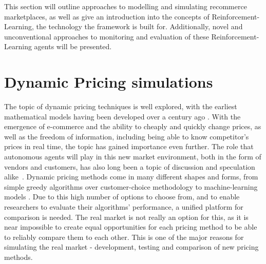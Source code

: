 \begin{jointwork}\label{ch:RelatedWork}
	This section will outline approaches to modelling and simulating recommerce marketplaces, as well as give an introduction into the concepts of Reinforcement-Learning, the technology the framework is built for. Additionally, novel and unconventional approaches to monitoring and evaluation of these Reinforcement-Learning agents will be presented.
\end{jointwork}

\section*{Dynamic Pricing simulations}

The topic of dynamic pricing techniques is well explored, with the earliest mathematical models having been developed over a century ago \cite{DynamicPricingHistory}. With the emergence of e-commerce and the ability to cheaply and quickly change prices, as well as the freedom of information, including being able to know competitor's prices in real time, the topic has gained importance even further. The role that autonomous agents will play in this new market environment, both in the form of vendors and customers, has also long been a topic of discussion and speculation alike~\cite{PricingBySoftwareAgents}. Dynamic pricing methods come in many different shapes and forms, from simple greedy algorithms over customer-choice methodology to machine-learning models \cite{deGeerPricing}. Due to this high number of options to choose from, and to enable researchers to evaluate their algorithms' performance, a unified platform for comparison is needed. The real market is not really an option for this, as it is near impossible to create equal opportunities for each pricing method to be able to reliably compare them to each other. This is one of the major reasons for simulating the real market - development, testing and comparison of new pricing methods.

